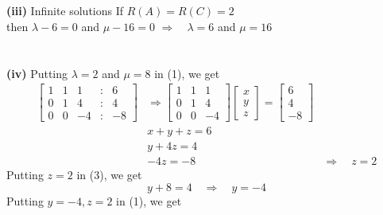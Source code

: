 \begin{enumerate}[label=\color{ocre}\textbf{\arabic*.}]
\begin{answer}
\\\\\textbf{(iii)} Infinite solutions If $R(A)=R(C)=2$
\\then $\lambda-6=0$ and $\mu-16=0$
$\Rightarrow \quad \lambda=6$ and $\mu=16$\\
\\\\\textbf{(iv)} Putting $\lambda=2$ and $\mu=8$ in (1), we get
$$
\begin{aligned}
\left[\begin{array}{rrrrr}
1 & 1 & 1 & : & 6 \\
0 & 1 & 4 & : & 4 \\
0 & 0 & -4 & : & -8
\end{array}\right] & \Rightarrow\left[\begin{array}{rrr}
1 & 1 & 1 \\
0 & 1 & 4 \\
0 & 0 & -4
\end{array}\right]\left[\begin{array}{l}
x \\
y \\
z
\end{array}\right]=\left[\begin{array}{r}
6 \\
4 \\
-8
\end{array}\right] \\
& x+y+z=6 \\
& y+4 z=4 \\
&-4 z=-8 & \Rightarrow \quad z=2
\end{aligned}
$$
Putting $z=2$ in (3), we get
$$
y+8=4 \quad \Rightarrow \quad y=-4
$$
Putting $y=-4, z=2$ in (1), we get\\


\end{answer}
\end{enumerate}
